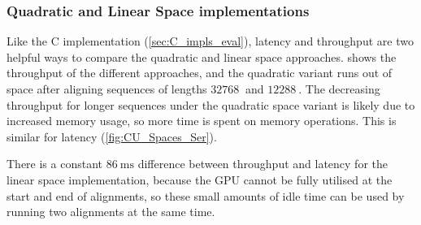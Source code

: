 \subsubsection{Quadratic and Linear Space implementations}
\label{sec:CUDA impls. eval}

Like the C implementation (\cref{sec:C_impls_eval}), latency and throughput are two helpful ways to compare the quadratic and linear space approaches.
 shows the throughput of the different approaches, and the quadratic variant runs out of space after aligning sequences of lengths $\SI{32768}{}$ and $\SI{12288}{}$.
The decreasing throughput for longer sequences under the quadratic space variant is likely due to increased memory usage, so more time is spent on memory operations.
This is similar for latency (\cref{fig:CU_Spaces_Ser}).

There is a constant $\SI{86}{\milli\s}$ difference between throughput and latency for the linear space implementation, because the GPU cannot be fully utilised at the start and end of alignments, so these small amounts of idle time can be used by running two alignments at the same time.

